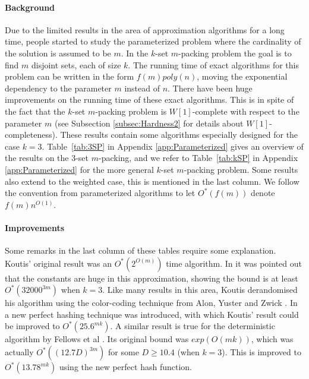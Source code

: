 \paragraph{Background} Due to the limited results in the area of approximation algorithms for a long time, people started to study the parameterized problem where the cardinality of the solution is assumed to be $m$. In the $k$-set $m$-packing problem the goal is to find $m$ disjoint sets, each of size $k$. The running time of exact algorithms for this problem can be written in the form $f(m)poly(n)$, moving the exponential dependency to the parameter $m$ instead of $n$. There have been huge improvements on the running time of these exact algorithms. This is in spite of the fact that the $k$-set $m$-packing problem is $W[1]$-complete with respect to the parameter $m$ \cite{DowneyFellows} (see Subsection \ref{subsec:Hardness2} for details about $W[1]$-completeness). These results contain %
some algorithms especially designed for the case $k=3$. Table~\ref{tab:3SP} in Appendix \ref{app:Parameterized} gives an overview of the results on the 3-set $m$-packing, and we refer to Table~\ref{tab:kSP} in Appendix \ref{app:Parameterized} for %
the more general $k$-set $m$-packing problem. Some results also extend to the weighted case, this is mentioned in the last column. We follow the convention from parameterized algorithms to let $O^*(f(m))$ denote $f(m)n^{O(1)}$.

\paragraph{Improvements} Some remarks in the last column of these tables require some explanation. Koutis' \cite{Koutis1} original result was an $O^*(2^{O(m)})$ time algorithm. In \cite{SmallColorCoding,GreedyLocalization} it was pointed out that the constants are huge in this approximation, showing the bound is at least $O^*(32000^{3m})$ when $k=3$. Like many results in this area, Koutis derandomised his algorithm using the color-coding technique from Alon, Yuster and Zwick \cite{ColorCoding}. In \cite{SmallColorCoding,GreedyLocalization} a new perfect hashing technique was introduced, with which Koutis' result could be improved to $O^*(25.6^{mk})$. A similar result is true for the deterministic algorithm by Fellows et al \cite{Fellows}. Its original bound was $exp(O(mk))$, which was actually $O^*((12.7D)^{3m})$ for some $D \geq 10.4$ (when $k=3$). This is improved to $O^*(13.78^{mk})$ using the new perfect hash function.

